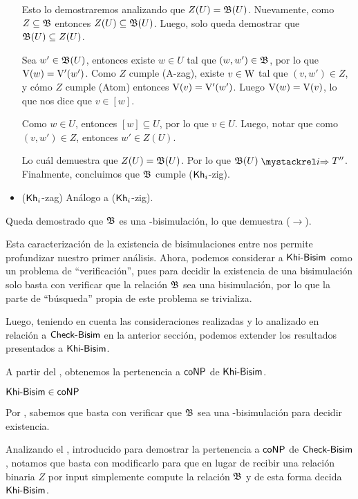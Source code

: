 \begin{demostracion}
\begin{itemize}
        Esto lo demostraremos analizando que $Z(U) = \mathfrak{B}(U)$. Nuevamente, como $Z \subseteq \mathfrak{B}$
        entonces $Z(U) \subseteq \mathfrak{B}(U)$. Luego, solo queda demostrar que $\mathfrak{B}(U) \subseteq Z(U)$.
    
        Sea $w' \in \mathfrak{B}(U)$, entonces existe $w \in U$ tal que $(w,w') \in \mathfrak{B}$, por lo que $\mathrm{V}(w) = \mathrm{V}'(w')$. 
        Como $Z$ cumple (A-zag), existe $v \in \mathrm{W}$ tal que $(v,w') \in Z$, y cómo $Z$ cumple 
        (Atom) entonces $\mathrm{V}(v) = \mathrm{V}'(w')$. Luego $\mathrm{V}(w) = \mathrm{V}(v)$, lo que nos dice que $v \in [w]$.
    
        Como $w \in U$, entonces $[w] \subseteq U$, por lo que $v \in U$. Luego, notar que como $(v,w') \in Z$, entonces
        $w' \in Z(U)$.
    
        Lo cuál demuestra que $Z(U) = \mathfrak{B}(U)$. Por lo que $\universalbis(U) \ultsExecAgi T''$. Finalmente, concluimos 
        que $\mathfrak{B}$ cumple ($\mathsf{Kh}_i$-zig).
    
    
        \item ($\mathsf{Kh}_i$-zag) Análogo a ($\mathsf{Kh}_i$-zig).
    \end{itemize}
    Queda demostrado que $\mathfrak{B}$ es una \KHilogic-bisimulación, lo que demuestra ($\rightarrow$).
\end{demostracion}

Esta caracterización de la existencia de bisimulaciones entre \ultss
nos permite profundizar nuestro primer análisis. Ahora, podemos considerar a $\rm\textsf{Khi-Bisim}$ como un problema de ``verificación'', 
pues para decidir la existencia de una bisimulación solo basta con verificar que la relación $\mathfrak{B}$ sea una bisimulación, por lo 
que la parte de ``búsqueda'' propia de este problema se trivializa.

Luego, teniendo en cuenta las consideraciones realizadas y lo analizado en relación a $\rm\textsf{Check-Bisim}$ en la anterior sección, podemos extender los 
resultados presentados a $\rm\textsf{Khi-Bisim}$.

A partir del , obtenemos la pertenencia a $\rm\textsf{coNP}$ de $\rm\textsf{Khi-Bisim}$.

\begin{lema}\label{lema:khibisim-in-conp}
    $\rm\textsf{Khi-Bisim} \in \rm\textsf{coNP}$ 
\end{lema}

\begin{demostracion}
    Por , sabemos que basta con verificar que $\mathfrak{B}$ sea una \KHilogic-bisimulación para decidir existencia. 

    Analizando el , introducido para demostrar la pertenencia a $\rm\textsf{coNP}$ de $\rm\textsf{Check-Bisim}$, notamos que 
    basta con modificarlo para que en lugar de recibir una relación binaria $Z$ por input simplemente compute la relación $\mathfrak{B}$ y de esta 
    forma decida $\rm\textsf{Khi-Bisim}$.
\end{demostracion}

